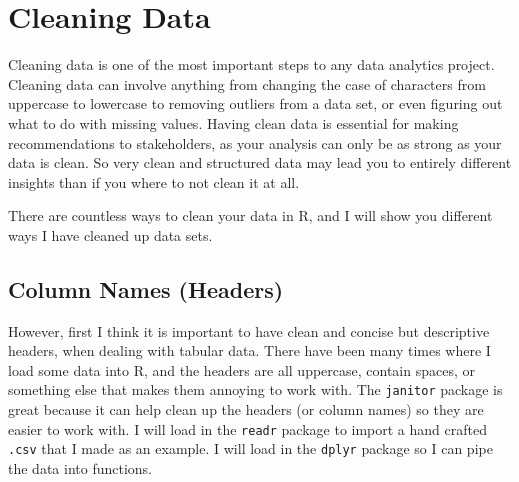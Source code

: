 \documentclass[
  letterpaper,
  DIV=11,
  numbers=noendperiod]{scrreprt}
\begin{document}

\hypertarget{cleaning-data}{%
\chapter{Cleaning Data}\label{cleaning-data}}

Cleaning data is one of the most important steps to any data analytics
project. Cleaning data can involve anything from changing the case of
characters from uppercase to lowercase to removing outliers from a data
set, or even figuring out what to do with missing values. Having clean
data is essential for making recommendations to stakeholders, as your
analysis can only be as strong as your data is clean. So very clean and
structured data may lead you to entirely different insights than if you
where to not clean it at all.

There are countless ways to clean your data in R, and I will show you
different ways I have cleaned up data sets.

\hypertarget{column-names-headers}{%
\section{Column Names (Headers)}\label{column-names-headers}}

However, first I think it is important to have clean and concise but
descriptive headers, when dealing with tabular data. There have been
many times where I load some data into R, and the headers are all
uppercase, contain spaces, or something else that makes them annoying to
work with. The \texttt{janitor} package is great because it can help
clean up the headers (or column names) so they are easier to work with.
I will load in the \texttt{readr} package to import a hand crafted
\texttt{.csv} that I made as an example. I will load in the
\texttt{dplyr} package so I can pipe the data into functions.
\end{document}
